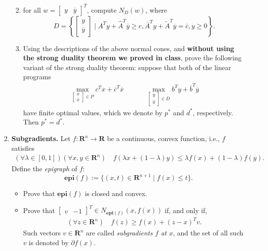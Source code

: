 \documentclass[11pt]{article}
\newcommand{\RR}{\mathbf{R}}
\newcommand{\epi}{\textbf{epi}}
\begin{document}
\begin{enumerate}
\begin{enumerate}
$$$$
 \item for all $w = \begin{bmatrix} y & \overline{y}\end{bmatrix}^T$, compute $N_{D}(w)$, where 
$$
D = \left\{\begin{bmatrix} y \\ \overline{y}\end{bmatrix} \mid A^Ty + \hat{A}^T\overline{y} \geq  c, \overline{A}^Ty + \widetilde{A}^T\overline{y} = \overline{c}, y \geq 0\right\}. 
$$
\item Using the descriptions of the above normal cones, and \textbf{without using the strong duality theorem we proved in class}, prove the following variant of the strong duality theorem: suppose that both of the linear programs 
\begin{align*}
\max_{\begin{bmatrix} x \\ \overline{x}\end{bmatrix} \in P}c^Tx + \overline{c}^T \overline{x} && && \max_{\begin{bmatrix} y \\ \overline{y}\end{bmatrix} \in D}b^Ty + \overline{b}^T \overline{y}
\end{align*}
have finite optimal values, which we denote by $p^\ast$ and $d^\ast$, respectively. Then $p^\ast = d^\ast.$ 
\end{enumerate}
\item \textbf{Subgradients.} Let $f : \RR^n \rightarrow \RR$ be a continuous, convex function, i.e., $f$ satisfies
\begin{align*}
\left(\forall \lambda \in [0, 1]\right)\left(\forall x, y \in \RR^n\right)\quad f(\lambda x + (1-\lambda)y ) \leq \lambda f(x) + (1-\lambda) f(y).
\end{align*}
Define the \textit{epigraph} of $f$: 
$$
\epi(f) := \{ (x, t) \in \RR^{n+1} \mid f(x) \leq t\}.
$$
\begin{itemize}
\item Prove that $\epi(f)$ is closed and convex. 
\item Prove that $\begin{bmatrix} v & -1 \end{bmatrix}^T \in N_{\epi(f)}(x, f(x))$ if, and only if, 
\begin{align*}
\left(\forall z \in \RR^n \right) \quad f(z) \geq f(x) + (z - x)^Tv.
\end{align*}
Such vectors $v \in \RR^n$ are called \textit{subgradients $f$ at $x$}, and the set of all such $v$ is denoted by $\partial f(x)$.

\end{itemize}
\end{enumerate}
\end{document}

